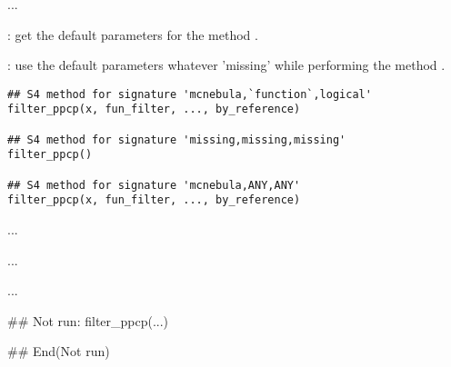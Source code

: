 \documentclass[letterpaper]{book}
\begin{document}
%
\begin{Description}\relax
...

: get the default parameters for the method
.

: use the default parameters whatever 'missing'
while performing the method .
\end{Description}
%
\begin{Usage}
\begin{verbatim}
## S4 method for signature 'mcnebula,`function`,logical'
filter_ppcp(x, fun_filter, ..., by_reference)

## S4 method for signature 'missing,missing,missing'
filter_ppcp()

## S4 method for signature 'mcnebula,ANY,ANY'
filter_ppcp(x, fun_filter, ..., by_reference)
\end{verbatim}
\end{Usage}
%
\begin{Arguments}
\begin{ldescription}
\item[\code{param}] ...
\end{ldescription}
\end{Arguments}
%
\begin{Details}\relax
...
\end{Details}
%
\begin{Value}
...
\end{Value}
%
\begin{SeeAlso}\relax
{}
\end{SeeAlso}
%
\begin{Examples}
\begin{ExampleCode}
## Not run: 
filter_ppcp(...)

## End(Not run)
\end{ExampleCode}
\end{Examples}
\end{document}
